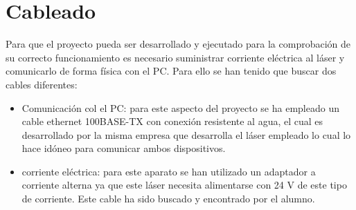 \section{Cableado}

Para que el proyecto pueda ser desarrollado y ejecutado para la comprobación de su correcto funcionamiento es necesario suministrar corriente eléctrica al láser y comunicarlo de forma física con el PC. Para ello se han tenido que buscar dos cables diferentes:
\begin{itemize}
	\item Comunicación col el PC: para este aspecto del proyecto se ha empleado un cable ethernet 100BASE-TX con conexión resistente al agua, el cual es desarrollado por la misma empresa que desarrolla el láser empleado lo cual lo hace idóneo para comunicar ambos dispositivos.\\
	\item corriente eléctrica: para este aparato se han utilizado un adaptador a corriente alterna ya que este láser necesita alimentarse con 24 V de este tipo de corriente. Este cable ha sido buscado y encontrado por el alumno.
\end{itemize}